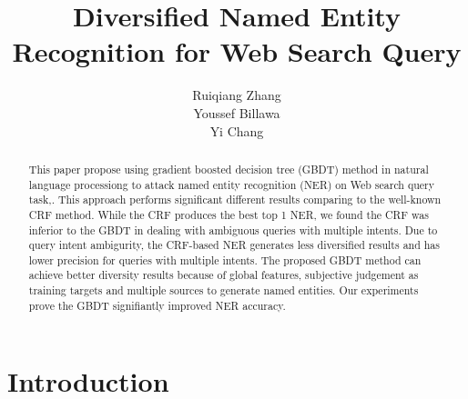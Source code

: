 \documentclass[11pt]{article}
\begin{document}




\title{Diversified Named Entity Recognition for Web Search Query}

\author{Ruiqiang Zhang \\
  \And   Youssef Billawa \\
 \And Yi Chang 
}
\maketitle


\begin{abstract}
This paper propose using  gradient boosted decision tree (GBDT) method in natural language processiong to attack named entity recognition (NER) on Web search query task,. This approach performs significant different results comparing to the well-known CRF method. While the CRF produces the best top 1 NER, we found the CRF was inferior to the GBDT in dealing with ambiguous queries with multiple intents.  Due to query intent ambigurity, the CRF-based NER generates less diversified results and has lower precision for queries with multiple intents. The proposed GBDT method can achieve better diversity results because of global features, subjective judgement as training targets and multiple sources to generate named entities. Our experiments prove the GBDT signifiantly improved NER accuracy.
\end{abstract}





\section{Introduction}
\end{document}

